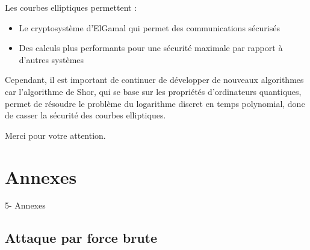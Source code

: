 \documentclass[
	11pt, %
]{beamer}
\begin{document}
\begin{frame}
	Les courbes elliptiques permettent :
	\begin{itemize}
		\item Le cryptosystème d'ElGamal qui permet des communications sécurisés 
		\item Des calculs plus performants pour une sécurité maximale par rapport à d'autres systèmes
	\end{itemize}
	\bigskip
	Cependant, il est important de continuer de développer de nouveaux algorithmes car l'algorithme de Shor, qui se base
	sur les propriétés d'ordinateurs quantiques, permet de résoudre le problème du logarithme discret en temps polynomial, donc de casser la sécurité des courbes elliptiques.
\end{frame}


\begin{frame}[plain] %
	\begin{center}
		{\LARGE Merci pour votre attention.}
	\end{center}
\end{frame}

\appendix
\section*{Annexes}


\begin{frame} %
	\begin{center}
		{\LARGE 5- Annexes}
	\end{center}
\end{frame}



\subsection{Attaque par force brute}
\end{document}
